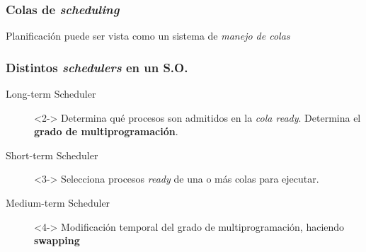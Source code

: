\documentclass[letter]{beamer}
\begin{document}
\begin{frame}
  \frametitle{Colas de {\em scheduling}}

  Planificación puede ser vista como un sistema de {\em manejo de colas}

  


\end{frame}


\begin{frame}
  \frametitle{Distintos {\em schedulers} en un S.O.}

  \begin{description}
    \item[Long-term Scheduler]<2-> Determina qué procesos son admitidos en la {\em cola ready}.
                               Determina el {\bf grado de multiprogramación}.
    \item[Short-term Scheduler]<3-> Selecciona procesos {\em ready} de una o más colas para ejecutar.
    \item[Medium-term Scheduler]<4-> Modificación temporal del grado de multiprogramación, haciendo {\bf swapping}
  \end{description}
  

\end{frame}
\end{document}
